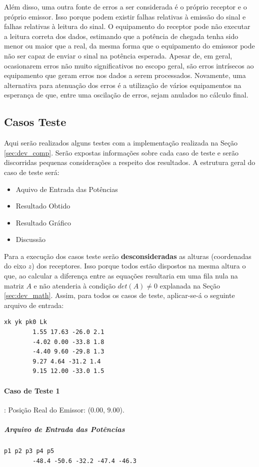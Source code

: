 	Além disso, uma outra fonte de erros a ser considerada é o próprio receptor e o próprio emissor. Isso porque podem existir falhas relativas à
	emissão do sinal e falhas relativas à leitura do sinal. O equipamento do receptor pode não executar a leitura correta dos dados, estimando
	que a potência de chegada tenha sido menor ou maior que a real, da mesma forma que o equipamento do emisssor pode não ser capaz de enviar o sinal na
	potência esperada. Apesar de, em geral, ocasionarem erros não muito significativos no escopo geral, são erros intrísecos ao equipamento que geram
	erros nos dados a serem processados. Novamente, uma alternativa para atenuação dos erros é a utilização de vários equipamentos na esperança de que,
	entre uma oscilação de erros, sejam anulados no cálculo final.

	\subsection{Casos Teste}
	Aqui serão realizados alguns testes com a implementação realizada na Seção \ref{sec:dev_comp}. Serão expostas informações sobre cada caso de teste
	e serão discorridas pequenas considerações a respeito dos resultados. A estrutura geral do caso de teste será:
	\begin{itemize}
  	\item Aquivo de Entrada das Potências
		\item Resultado Obtido
		\item Resultado Gráfico
		\item Discussão
	\end{itemize}

	Para a execução dos casos teste serão \textbf{desconsideradas} as alturas (coordenadas do eixo $z$) dos receptores. Isso porque todos estão
	dispostos na mesma altura o que, ao calcular a diferença entre as equações resultaria em uma fila nula na matriz $A$ e não atenderia à condição
	$det(A)\neq0$ explanada na Seção \ref{sec:dev_math}. Assim, para todos os casos de teste, aplicar-se-á o seguinte arquivo de entrada:
	\begin{Verbatim}[fontsize=\footnotesize]
		xk yk pk0 Lk
		1.55 17.63 -26.0 2.1
		-4.02 0.00 -33.8 1.8
		-4.40 9.60 -29.8 1.3
		9.27 4.64 -31.2 1.4
		9.15 12.00 -33.0 1.5
	\end{Verbatim}

	\paragraph{Caso de Teste 1}: Posição Real do Emissor: ($0.00$, $9.00$).
	\subparagraph{Arquivo de Entrada das Potências}
	\begin{Verbatim}[fontsize=\footnotesize]
		p1 p2 p3 p4 p5
		-48.4 -50.6 -32.2 -47.4 -46.3
	\end{Verbatim}

